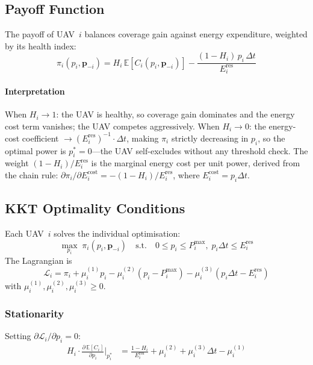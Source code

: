 \documentclass[journal]{IEEEtran}
\begin{document}
\subsection{Payoff Function}

The payoff of UAV~$i$ balances coverage gain against
energy expenditure, weighted by its health index:
\begin{equation}
\label{eq:payoff}
\pi_i(p_i,\mathbf{p}_{-i})
=
H_i\,\mathbb{E}\!\left[C_i(p_i,\mathbf{p}_{-i})\right]
-
\frac{(1-H_i)\,p_i\,\Delta t}{E_i^{\mathrm{res}}}
\end{equation}

\paragraph{Interpretation}
When $H_{i}\to1$: the UAV is healthy, so coverage gain
dominates and the energy cost term vanishes; the UAV
competes aggressively.  When $H_{i}\to0$: the energy-cost
coefficient $\to(E_{i}^{\mathrm{res}})^{-1}\cdot\Delta t$, making
$\pi_{i}$ strictly decreasing in $p_{i}$, so the optimal
power is $p_{i}^{*}=0$—the UAV self-excludes without any
threshold check.  The weight $(1-H_{i})/{E_i^{\mathrm{res}}}$
is the marginal energy cost per unit power, derived from
the chain rule: $\partial\pi_{i}/\partial E_{i}^{\mathrm{cost}}
=-( 1-H_{i})/{E_i^{\mathrm{res}}}$, where $E_{i}^{\mathrm{cost}}
=p_{i}\Delta t$.

\subsection{KKT Optimality Conditions}\label{sec:kkt}

Each UAV~$i$ solves the individual optimisation:
\begin{equation}\label{eq:indiv_opt}
  \max_{p_{i}}\;\pi_{i}(p_{i},\mathbf{p}_{-i})
  \quad\text{s.t.}\quad
  0\leq p_{i}\leq P_{i}^{\max},\;
  p_{i}\Delta t\leq E_{i}^{\mathrm{res}}
\end{equation}
The Lagrangian is
\begin{equation}\label{eq:lagrangian}
  \mathcal{L}_{i}=\pi_{i}
  +\mu_{i}^{(1)}p_{i}
  -\mu_{i}^{(2)}(p_{i}-P_{i}^{\max})
  -\mu_{i}^{(3)}(p_{i}\Delta t-E_{i}^{\mathrm{res}})
\end{equation}
with $\mu_{i}^{(1)},\mu_{i}^{(2)},\mu_{i}^{(3)}\geq0$.

\subsubsection{Stationarity}
Setting $\partial\mathcal{L}_{i}/\partial p_{i}=0$:
\begin{align}\label{eq:stationarity}
  H_{i}\cdot\frac{\partial\,\mathbb{E}[C_{i}]}{\partial p_{i}}
  \Bigg|_{p_{i}^{*}}
  &=\frac{1-H_{i}}{E_i^{\mathrm{res}}}
   +\mu_{i}^{(2)}+\mu_{i}^{(3)}\Delta t
   -\mu_{i}^{(1)}
\end{align}
\end{document}
